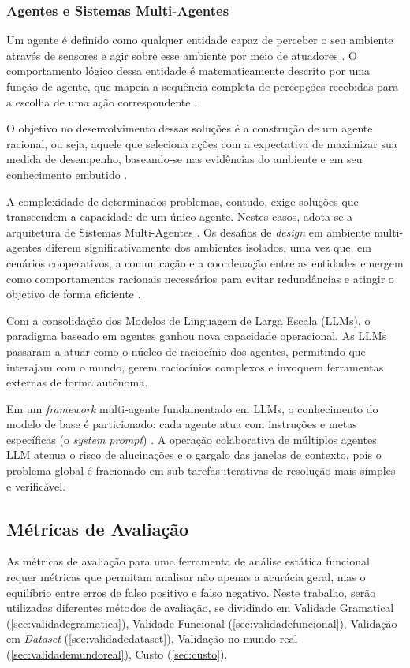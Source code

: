\documentclass[
    12pt,                %
    openright,           %
    oneside,             %
    a4paper,             %
    english,             %
    brazil               %
]{abntex2}
\begin{document}
\begin{itemize}
\subsubsection{Agentes e Sistemas Multi-Agentes}
\label{sec:agentes}
\par
Um agente é definido como qualquer entidade capaz de perceber o seu ambiente através de sensores e agir sobre esse ambiente por meio de atuadores \cite{russell2020artificial}.
O comportamento lógico dessa entidade é matematicamente descrito por uma função de agente, que mapeia a sequência completa de percepções recebidas para a escolha de uma ação correspondente \cite{russell2020artificial}.
\par
O objetivo no desenvolvimento dessas soluções é a construção de um agente racional, ou seja, aquele que seleciona ações com a expectativa de maximizar sua medida de desempenho, baseando-se nas evidências do ambiente e em seu conhecimento embutido \cite{russell2020artificial}.
\par
A complexidade de determinados problemas, contudo, exige soluções que transcendem a capacidade de um único agente.
Nestes casos, adota-se a arquitetura de Sistemas Multi-Agentes \cite{russell2020artificial}.
Os desafios de \textit{design} em ambiente multi-agentes diferem significativamente dos ambientes isolados, uma vez que, em cenários cooperativos, a comunicação e a coordenação entre as entidades emergem como comportamentos racionais necessários para evitar redundâncias e atingir o objetivo de forma eficiente \cite{russell2020artificial}.
\par
Com a consolidação dos Modelos de Linguagem de Larga Escala (LLMs), o paradigma baseado em agentes ganhou nova capacidade operacional.
As LLMs passaram a atuar como o núcleo de raciocínio dos agentes, permitindo que interajam com o mundo, gerem raciocínios complexos e invoquem ferramentas externas de forma autônoma.
\par
Em um \textit{framework} multi-agente fundamentado em LLMs, o conhecimento do modelo de base é particionado: cada agente atua com instruções e metas específicas (o \textit{system prompt}) \cite{russell2020artificial}.
A operação colaborativa de múltiplos agentes LLM atenua o risco de alucinações e o gargalo das janelas de contexto, pois o problema global é fracionado em sub-tarefas iterativas de resolução mais simples e verificável.

\subsection{Métricas de Avaliação}
\label{sec:metricasavaliacao}
\par
As métricas de avaliação para uma ferramenta de análise estática funcional requer métricas que permitam analisar não apenas a acurácia geral, mas o equilíbrio entre erros de falso positivo e falso negativo. 
Neste trabalho, serão utilizadas diferentes métodos de avaliação, se dividindo em Validade Gramatical (\ref{sec:validadegramatica}), Validade Funcional (\ref{sec:validadefuncional}), Validação em \textit{Dataset} (\ref{sec:validadedataset}), Validação no mundo real (\ref{sec:validademundoreal}), Custo (\ref{sec:custo}).


\end{itemize}
\end{document}
